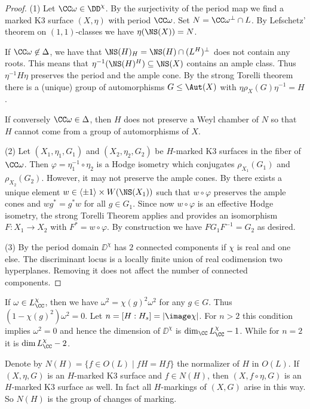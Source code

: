 \begin{proof}
(1) Let $\CC \omega \in \DD^\chi$.
By the surjectivity of the period map we find a marked K3 surface $(X,\eta)$ with period $\CC \omega$.
Set $N = \CC \omega^\perp \cap L$. By Lefschetz' theorem on $(1,1)$-classes we have $\eta(\NS(X))=N$.

  If $\CC\omega \not \in \Delta$, we have that $\NS(H)_H = \NS(H) \cap (L^H)^\perp$ does not contain any roots. This means that $\eta^{-1}(\NS(H)^H)\subseteq \NS(X)$ contains an ample class.
Thus $\eta^{-1} H \eta$ preserves the period and the ample cone. By the strong Torelli theorem there is a (unique) group of automorphisms $G\leq \Aut(X)$ with
$\eta \rho_X(G) \eta^{-1}=H$.

If conversely $\CC \omega \in \Delta$, then $H$ does not preserve a Weyl chamber of $N$ so that $H$ cannot come from a group of automorphisms of $X$.

(2) Let $(X_1,\eta_1,G_1)$ and $(X_2,\eta_2,G_2)$ be $H$-marked K3 surfaces in the fiber of $\CC \omega$.
Then $\varphi = \eta_1^{-1} \circ \eta_2$ is a Hodge isometry which conjugates $\rho_{X_1}(G_1)$ and $\rho_{X_2}(G_2)$. However, it may not preserve the ample cones. By \cite[Lemma 1.7 and Theorem 1.8]{oguiso-sakurai} there exists a unique element $w \in \langle \pm 1\rangle \times W(\NS(X_1))$
such that $w \circ \varphi$ preserves the ample cones and $w g^*= g^* w$ for all $g \in G_1$. Since now $w \circ \varphi$ is an effective Hodge isometry, the strong Torelli Theorem applies and provides an isomorphism $F\colon X_1 \to X_2$ with $F^*=w \circ \varphi$.
By construction we have $FG_1 F^{-1} = G_2$ as desired.

  (3) By \cite[\S9 \& \S 11]{dolgachev-kondo2005} the period domain $\DD^\chi$ has $2$ connected components if $\chi$ is real and one else. The discriminant locus is a locally finite union of real codimension two hyperplanes. Removing it does not affect the number of connected components.
\end{proof}


\begin{remark}
If $\omega \in L_\CC^\chi$, then we have $\omega^2 = \chi(g)^2 \omega^2$ for any $g \in G$. Thus $(1-\chi(g)^2)\omega^2=0$.
Let $n = [H:H_s]=\lvert \image \chi \rvert$. For $n>2$ this condition implies $\omega^2=0$ and hence the dimension of $\DD^\chi$ is $\dim_\CC L^\chi_\CC -1$.
While for $n=2$ it is $\dim L^\chi_\CC -2$.
\end{remark}

Denote by $N(H)=\{f \in O(L) \mid f H = H f\}$ the normalizer of $H$ in $O(L)$.
If $(X,\eta,G)$ is an $H$-marked K3 surface and $f \in N(H)$, then $(X,f \circ \eta, G)$ is an $H$-marked K3 surface as well. In fact all $H$-markings of $(X,G)$ arise in this way.
So $N(H)$ is the group of changes of marking.

